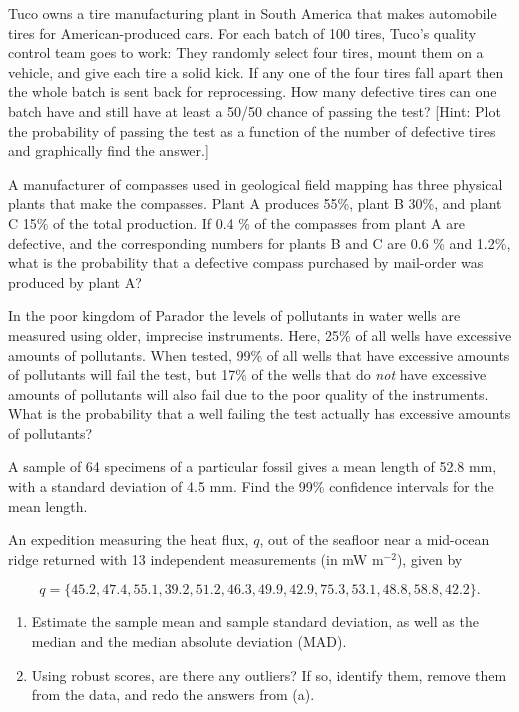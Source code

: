 \begin{problem}
Tuco owns a tire manufacturing plant in South America that makes
automobile tires for American-produced cars.  For each batch of 100 tires, Tuco's quality control
team goes to work:  They randomly select four tires, mount them on a vehicle, and
give each tire a solid kick.  If any one of the four tires fall apart then the whole batch is sent
back for reprocessing.  How many defective tires can one batch have and still have at least
a 50/50 chance of passing the test? [Hint: Plot the probability of passing the
test as a function of the number of defective tires and graphically find the answer.]
\end{problem}

\begin{problem}
A manufacturer of compasses used in geological field mapping
has three physical plants that make the compasses.  Plant A produces 55\%, plant B 30\%, and plant
C 15\% of the total production.  If 0.4 \% of the compasses from plant A are defective, and the corresponding
numbers for plants B and C are 0.6 \% and 1.2\%, what is the probability that a defective
compass purchased by mail-order was produced by plant A?

\end{problem}

\begin{problem}
In the poor kingdom of Parador the levels of pollutants in water wells are measured using older,
imprecise instruments.  Here, 25\% of all wells have excessive amounts of pollutants.  When tested, 99\% of all
wells that have excessive amounts of pollutants will fail the test, but 17\% of the wells that do \emph{not} have
excessive amounts of pollutants will also fail due to the poor quality of the instruments.  What is the
probability that a well failing the test actually has excessive amounts of pollutants?
\end{problem}

\begin{problem}
A sample of 64 specimens of a particular fossil gives a mean length of 52.8 mm, with a standard deviation of 4.5 mm.
Find the 99\% confidence intervals for the mean length.
\end{problem}

\begin{problem}
An expedition measuring the heat flux, $q$, out of the seafloor near a mid-ocean ridge returned
with 13 independent measurements (in mW m$^{-2}$), given by

\[
q = \{45.2, 47.4, 55.1, 39.2, 51.2, 46.3, 49.9, 42.9,
75.3, 53.1, 48.8, 58.8, 42.2\}.
\]

\begin{enumerate}[label=\alph*)]
\item Estimate the sample mean and sample standard deviation, as well as
the median and the median absolute deviation (MAD).
\item Using robust scores, are there any outliers?  If so, identify them,
remove them from the data, and redo the answers from (a).
\end{enumerate}
\end{problem}

